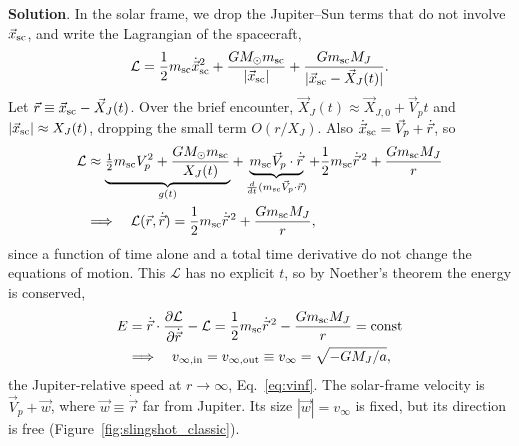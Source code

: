 \textbf{Solution}. In the solar frame, we drop the Jupiter--Sun terms that do not involve $\vec x_{\rm sc}$, and write the Lagrangian of the spacecraft,
\begin{equation}
	\mathcal L = \frac12 m_{\rm sc}\dot{\vec x}_{\rm sc}^2 + \frac{GM_\odot m_{\rm sc}}{|\vec x_{\rm sc}|} + \frac{Gm_{\rm sc}M_J}{|\vec x_{\rm sc}-\vec X_J(t)|}.
\end{equation}
Let $\vec r\equiv\vec x_{\rm sc}-\vec X_J(t)$. Over the brief encounter, $\vec X_J(t)\approx\vec X_{J,0}+\vec V_pt$ and $|\vec x_{\rm sc}|\approx X_J(t)$, dropping the small term $O(r/X_J)$. Also $\dot{\vec x}_{\rm sc}=\vec V_p+\dot{\vec r}$, so
\begin{align}
	\mathcal L &\approx \underbrace{\tfrac12m_{\rm sc}V_p^2+\dfrac{GM_\odot m_{\rm sc}}{X_J(t)}}_{g(t)} + \underbrace{m_{\rm sc}\vec V_p\cdot\dot{\vec r}}_{\frac{d}{dt}(m_{\rm sc}\vec V_p\cdot\vec r)} + \frac12m_{\rm sc}\dot{\vec r}^{\,2}+\frac{Gm_{\rm sc}M_J}{r}\\
	&\Longrightarrow\quad \mathcal L(\vec r,\dot{\vec r}) = \frac12m_{\rm sc}\dot{\vec r}^{\,2}+\frac{Gm_{\rm sc}M_J}{r},
	\label{eq:slingshot_effective_L}
\end{align}
since a function of time alone and a total time derivative do not change the equations of motion. This $\mathcal L$ has no explicit $t$, so by Noether's theorem the energy is conserved,
\begin{align}
	E &= \dot{\vec r}\cdot\pdv{\mathcal L}{\dot{\vec r}}-\mathcal L = \frac12m_{\rm sc}\dot{\vec r}^{\,2}-\frac{Gm_{\rm sc}M_J}{r}=\text{const}\\
	&\Longrightarrow\quad v_{\infty,\rm in}=v_{\infty,\rm out}\equiv v_\infty=\sqrt{-GM_J/a},
	\label{eq:slingshot_speed_conserved}
\end{align}
the Jupiter-relative speed at $r\to\infty$, Eq.~\eqref{eq:vinf}. The solar-frame velocity is $\vec V_p+\vec w$, where $\vec w\equiv\dot{\vec r}$ far from Jupiter. Its size $|\vec w|=v_\infty$ is fixed, but its direction is free (Figure~\ref{fig:slingshot_classic}).

